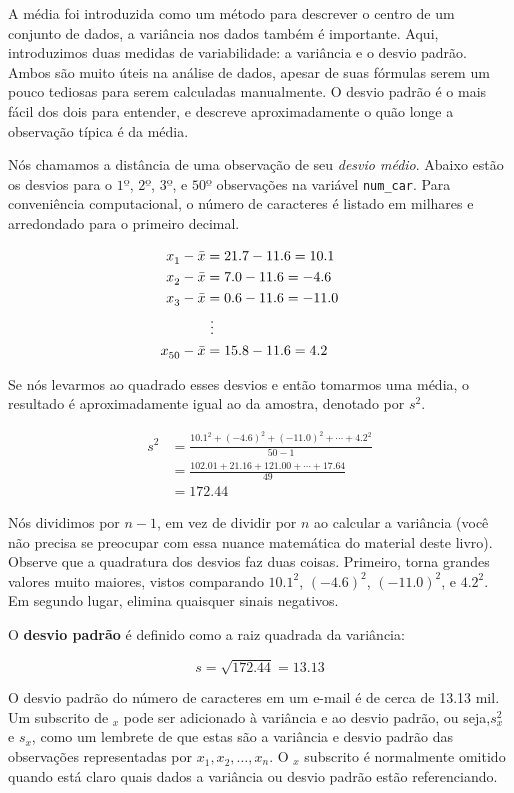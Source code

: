 \documentclass[
]{book}
\theoremstyle{definition}
\theoremstyle{definition}
\theoremstyle{definition}
\theoremstyle{definition}
\theoremstyle{remark}
\begin{document}
A média foi introduzida como um método para descrever o centro de um conjunto de dados, a variância nos dados também é importante. Aqui, introduzimos duas medidas de variabilidade: a variância e o desvio padrão. Ambos são muito úteis na análise de dados, apesar de suas fórmulas serem um pouco tediosas para serem calculadas manualmente. O desvio padrão é o mais fácil dos dois para entender, e descreve aproximadamente o quão longe a observação típica é da média.

Nós chamamos a distância de uma observação de seu \emph{desvio médio}. Abaixo estão os desvios para o \(1º\), \(2º\), \(3º\), e \(50º\) observações na variável \texttt{num\_car}. Para conveniência computacional, o número de caracteres é listado em milhares e arredondado para o primeiro decimal.

\begin{align*}
x_1^{}-\bar{x} &= 21.7 - 11.6 = 10.1 \hspace{5mm}\text{ } \\
x_2^{}-\bar{x} &= 7.0 - 11.6 = -4.6 \\
x_3^{}-\bar{x} &= 0.6 - 11.6 = -11.0 \\
            &\ \vdots \\
x_{50}^{}-\bar{x} &= 15.8 - 11.6 = 4.2
\end{align*}

Se nós levarmos ao quadrado esses desvios e então tomarmos uma média, o resultado é aproximadamente igual ao da amostra, denotado por \(s_{}^2\).

\begin{align*}
s_{}^2 &= \frac{10.1_{}^2 + (-4.6)_{}^2 + (-11.0)_{}^2 + \cdots + 4.2_{}^2}{50-1} \\
    &= \frac{102.01 + 21.16 + 121.00 + \cdots + 17.64}{49} \\
    &= 172.44
\end{align*}

Nós dividimos por \(n-1\), em vez de dividir por \(n\) ao calcular a variância (você não precisa se preocupar com essa nuance matemática do material deste livro). Observe que a quadratura dos desvios faz duas coisas. Primeiro, torna grandes valores muito maiores, vistos comparando \(10.1^2\), \((-4.6)^2\), \((-11.0)^2\), e \(4.2^2\). Em segundo lugar, elimina quaisquer sinais negativos.

O \textbf{desvio padrão} é definido como a raiz quadrada da variância:

\[s=\sqrt{172.44} = 13.13\]

O desvio padrão do número de caracteres em um e-mail é de cerca de 13.13 mil. Um subscrito de \(_x\) pode ser adicionado à variância e ao desvio padrão, ou seja,\(s_x^2\) e \(s_x^{}\), como um lembrete de que estas são a variância e desvio padrão das observações representadas por \(x_1^{}, x_2^{}, \dots, x_n^{}\). O \(_{x}\) subscrito é normalmente omitido quando está claro quais dados a variância ou desvio padrão estão referenciando.
\end{document}
